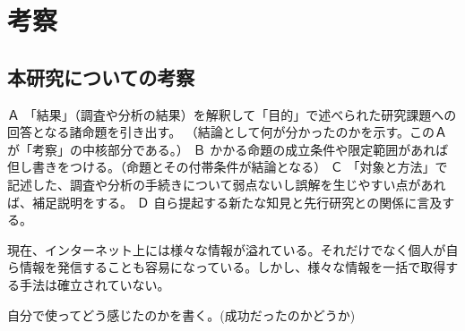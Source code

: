 \chapter{考察}
\label{chap:consideration}

\section{本研究についての考察}
Ａ 「結果」（調査や分析の結果）を解釈して「目的」で述べられた研究課題への回答となる諸命題を引き出す。
（結論として何が分かったのかを示す。このＡが「考察」の中核部分である。）
Ｂ かかる命題の成立条件や限定範囲があれば但し書きをつける。（命題とその付帯条件が結論となる）
Ｃ 「対象と方法」で記述した、調査や分析の手続きについて弱点ないし誤解を生じやすい点があれば、補足説明をする。
Ｄ 自ら提起する新たな知見と先行研究との関係に言及する。

現在、インターネット上には様々な情報が溢れている。それだけでなく個人が自ら情報を発信することも容易になっている。しかし、様々な情報を一括で取得する手法は確立されていない。

自分で使ってどう感じたのかを書く。(成功だったのかどうか)
